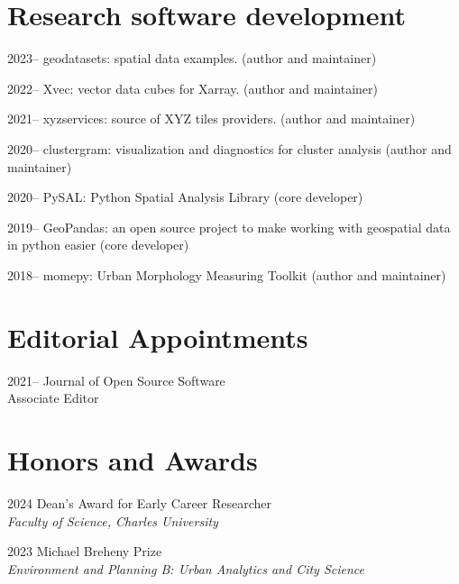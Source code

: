 \documentclass[12pt,a4paper]{report}
\begin{document}
    \section*{Research software development}

    \begin{tablist}

        \item[2023--] \tab{}geodatasets: spatial data examples. (author and maintainer)
        \item[2022--] \tab{}Xvec: vector data cubes for Xarray. (author and maintainer)
        \item[2021--] \tab{}xyzservices: source of XYZ tiles providers. (author and maintainer)
        \item[2020--] \tab{}clustergram: visualization and diagnostics for cluster analysis (author and maintainer)
        \item[2020--] \tab{}PySAL: Python Spatial Analysis Library (core developer)
        \item[2019--] \tab{}GeoPandas: an open source project to make working with geospatial data in python easier (core developer)
        \item[2018--] \tab{}momepy: Urban Morphology Measuring Toolkit (author and maintainer)

    \end{tablist}

    \section*{Editorial Appointments}

    \begin{tablist}

        \item[2021--] \tab{}Journal of Open Source Software \\
                            Associate Editor

    \end{tablist}

    \section*{Honors and Awards}

    \begin{tablist}

        \item[2024] \tab{}Dean's Award for Early Career Researcher \\
            \textit{Faculty of Science, Charles University}
        \item[2023] \tab{}Michael Breheny Prize \\
                    \textit{Environment and Planning B: Urban Analytics and City Science}

    \end{tablist}
\end{document}
